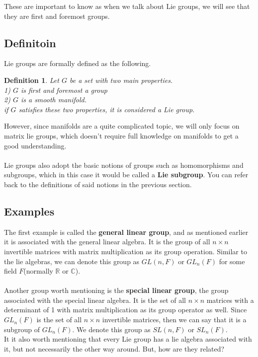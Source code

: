 \documentclass[12pt, letterpaper]{article}
\newcommand{\R}{\mathbb{R}}
\newcommand{\C}{\mathbb{C}}
\newtheorem{definition}{Definition}
\begin{document}
These are important to know as when we talk about Lie groups, we will see that they are first and foremost groups.
\subsection{Definitoin}
Lie groups are formally defined as the following.
\begin{definition}
Let $G$ be a set with two main properties. \\
  1) $G$ is first and foremost a group\\
  2) $G$ is a smooth manifold. \\
  if $G$ satisfies these two properties, it is considered a Lie group.
\end{definition}
However, since manifolds are a quite complicated topic, we will only focus on matrix lie groups, which doesn't require full knowledge on manifolds to get a good understanding.\\\\
Lie groups also adopt the basic notions of groups such as homomorphisms and subgroups, which in this case it would be called a \textbf{Lie subgroup}. You can refer back to the definitions of said notions in the previous section.

\subsection{Examples}
The first example is called the \textbf{general linear group}, and as mentioned earlier it is associated with the general linear algebra. It is the group of all $n \times n$ invertible matrices with matrix multiplication as its group operation. Similar to the lie algebras, we can denote this group as $GL(n, F)$ or $GL_n(F)$ for some field $F$(normally $\R$ or $\C$). \\\\
Another group worth mentioning is the \textbf{special linear group}, the group associated with the special linear algebra. It is the set of all $n \times n$ matrices with a determinant of 1 with matrix multiplication as its group operator as well. Since $GL_n(F)$ is the set of all $n \times n$ invertible matrices, then we can say that it is a subgroup of $GL_n(F)$. We denote this group as $SL(n, F)$ or $SL_n(F)$.\\

It it also worth mentioning that every Lie group has a lie algebra associated with it, but not necessarily the other way around. But, how are they related?
\end{document}
